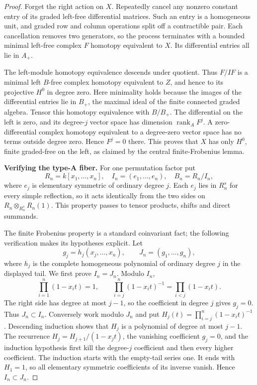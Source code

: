 \documentclass[11pt,a4paper]{article}
\theoremstyle{named}\newtheorem{finding}{Finding}[section]
\theoremstyle{definition}\newtheorem{definition}[finding]{Definition}
\theoremstyle{remark}\newtheorem{remark}[finding]{Remark}
\begin{document}
\begin{proof}
Forget the right action on \(X\). Repeatedly cancel any nonzero
constant entry of its graded left-free differential matrices.
Such an entry is a homogeneous unit, and graded row and column
operations split off a contractible pair. Each cancellation
removes two generators, so the process terminates with a bounded
minimal left-free complex \(F\) homotopy equivalent to \(X\).
Its differential entries all lie in \(A_+\).

The left-module homotopy equivalence descends under quotient.
Thus \(F/IF\) is a minimal left \(B\)-free complex homotopy
equivalent to \(Z\), and hence to its projective \(H^0\) in
degree zero. Here minimality holds because the images of the
differential entries lie in \(B_+\), the maximal ideal of the
finite connected graded algebra. Tensor this homotopy
equivalence with \(B/B_+\). The differential on the left is
zero, and its degree-\(j\) vector space has dimension
\(\operatorname{rank}_A F^j\). A zero-differential complex
homotopy equivalent to a degree-zero vector space has no terms
outside degree zero. Hence \(F^j=0\) there. This proves that
\(X\) has only \(H^0\), finite graded-free on the left, as
claimed by the central finite-Frobenius lemma.

\par\smallskip\noindent\textbf{Verifying the type-A fiber.}\quad
For one permutation factor put
\[
 R_n=k[x_1,\ldots,x_n],\quad
 I_n=(e_1,\ldots,e_n),\quad B_n=R_n/I_n,
\]
where \(e_j\) is elementary symmetric of ordinary degree \(j\).
Each \(e_j\) lies in \(R_n^s\) for every simple reflection,
so it acts identically from the two sides on
\(R_n\otimes_{R_n^s}R_n(1)\). This property passes to
tensor products, shifts and direct summands.

The finite Frobenius property is a standard coinvariant fact;
the following verification makes its hypotheses explicit.
Let
\[
 g_j=h_j(x_j,\ldots,x_n),\qquad J_n=(g_1,\ldots,g_n),
\]
where \(h_j\) is the complete homogeneous polynomial of
ordinary degree \(j\) in the displayed tail. We first prove
\(I_n=J_n\). Modulo \(I_n\),
\[
 \prod_{i=1}^n(1-x_it)=1,
 \qquad
 \prod_{i=j}^n(1-x_it)^{-1}=\prod_{i<j}(1-x_it).
\]
The right side has degree at most \(j-1\), so the coefficient
in degree \(j\) gives \(g_j=0\). Thus \(J_n\subset I_n\).
Conversely work modulo \(J_n\) and put
\(H_j(t)=\prod_{i=j}^n(1-x_it)^{-1}\).
Descending induction shows that \(H_j\) is a polynomial of
degree at most \(j-1\). The recurrence
\(H_j=H_{j+1}/(1-x_jt)\), the vanishing coefficient
\(g_j=0\), and the induction hypothesis first kill the
degree-\(j\) coefficient and then every higher coefficient.
The induction starts with the empty-tail series one.
It ends with \(H_1=1\), so all elementary symmetric
coefficients of its inverse vanish. Hence \(I_n\subset J_n\).


\end{proof}
\end{document}
